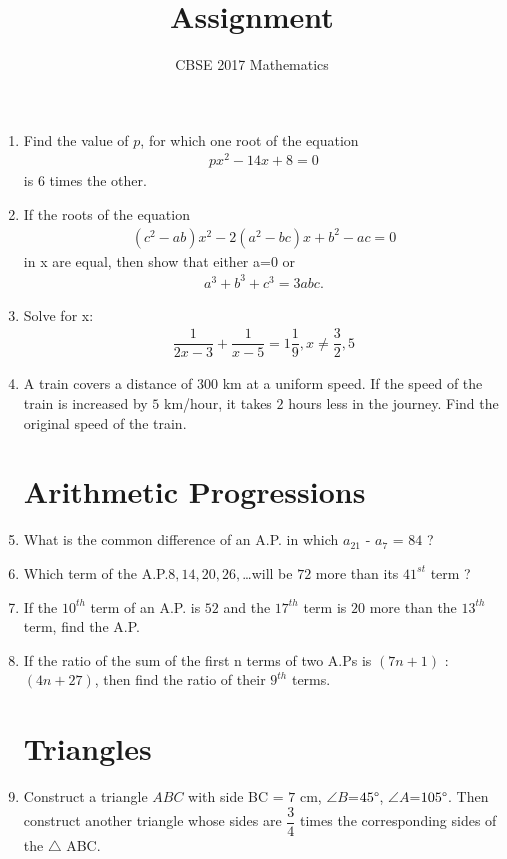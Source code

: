 \documentclass{article}
\title{Assignment}
\author{CBSE 2017 Mathematics}
\providecommand{\brak}[1]{\ensuremath{\left (#1\right)}}
\begin{document}
\maketitle
\begin{enumerate}
\section*{Quadratic Equations}
\item Find the value of $p$, for which one root of the equation 
\begin{align*}
	px^2-14x+8=0
\end{align*}
is $6$ times the other.
\item If the roots of the equation
\begin{align*}
	\brak{c^2-ab}x^2-2\brak{a^2-bc}x+b^2-ac=0 
\end{align*}
in x are equal, then show that either a=0 or 
\begin{align*}
	a^3+b^3+c^3=3abc.
\end{align*}
\item Solve for x:
\begin{align*}
\dfrac{1}{2x-3}+\dfrac{1}{x-5}=1\dfrac{1}{9}, x\neq\dfrac{3}{2},5 
\end{align*}
\item A train covers a distance of $300$ km at a uniform speed. If the speed of the train is increased by $5$ km/hour, it takes $2$ hours less in the journey. Find the original speed of the  train.

\section*{Arithmetic Progressions}
\item What is the common difference of an A.P. in which $a_{21}$ - $a_7$ = $84$ ?
\item Which term of the A.P.$8,14,20,26,$\ldots will be $72$ more than its $41^{st}$ term ?

\item If the $10^{th}$ term of an A.P. is $52$ and the $17^{th}$ term is $20$ more than the $13^{th}$ term, find the A.P.
\item If the ratio of the sum of the first n terms of two A.Ps is $\brak{7n + 1}$ : $\brak{4n + 27}$, then find the ratio of their $9^{th}$ terms.

\section*{Triangles}
\item Construct a triangle $ABC$ with side BC = $7$ cm, $\angle{B}$=$45\degree$, $\angle{A}$=$105\degree$. Then construct another triangle whose sides are  $\dfrac{3}{4}$  times the corresponding sides of the $\triangle$ ABC.


\end{enumerate}
\end{document}
